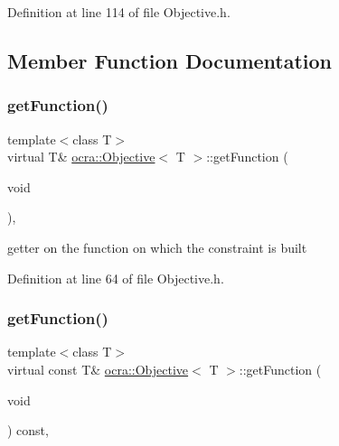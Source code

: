 Definition at line 114 of file Objective.\+h.



\subsection{Member Function Documentation}
\hypertarget{classocra_1_1Objective_acefbb478e0d9ae080ead812eea70e22e}{}\label{classocra_1_1Objective_acefbb478e0d9ae080ead812eea70e22e} 
\subsubsection{\texorpdfstring{get\+Function()}{getFunction()}\hspace{0.1cm}{\footnotesize\ttfamily [1/2]}}
{\footnotesize\ttfamily template$<$class T$>$ \\
virtual T\& \hyperlink{classocra_1_1Objective}{ocra\+::\+Objective}$<$ T $>$\+::get\+Function (\begin{DoxyParamCaption}\item[{void}]{ }\end{DoxyParamCaption})\hspace{0.3cm}{\ttfamily [inline]}, {\ttfamily [virtual]}}

getter on the function on which the constraint is built 

Definition at line 64 of file Objective.\+h.

\hypertarget{classocra_1_1Objective_a724137e4282c67586ce8b51a5b57845e}{}\label{classocra_1_1Objective_a724137e4282c67586ce8b51a5b57845e} 
\subsubsection{\texorpdfstring{get\+Function()}{getFunction()}\hspace{0.1cm}{\footnotesize\ttfamily [2/2]}}
{\footnotesize\ttfamily template$<$class T$>$ \\
virtual const T\& \hyperlink{classocra_1_1Objective}{ocra\+::\+Objective}$<$ T $>$\+::get\+Function (\begin{DoxyParamCaption}\item[{void}]{ }\end{DoxyParamCaption}) const\hspace{0.3cm}{\ttfamily [inline]}, {\ttfamily [virtual]}}



